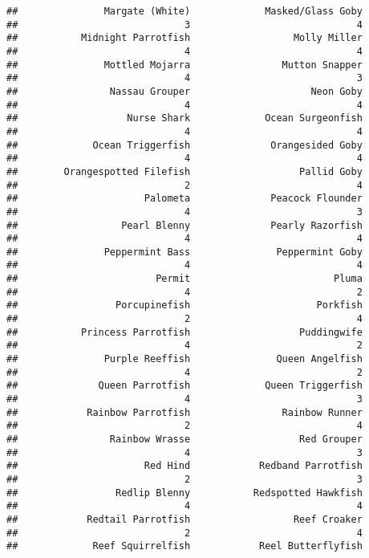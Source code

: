 \documentclass[
]{article}
\begin{document}
\begin{verbatim}
##               Margate (White)             Masked/Glass Goby 
##                             3                             4 
##           Midnight Parrotfish                  Molly Miller 
##                             4                             4 
##               Mottled Mojarra                Mutton Snapper 
##                             4                             3 
##                Nassau Grouper                     Neon Goby 
##                             4                             4 
##                   Nurse Shark             Ocean Surgeonfish 
##                             4                             4 
##             Ocean Triggerfish              Orangesided Goby 
##                             4                             4 
##        Orangespotted Filefish                   Pallid Goby 
##                             2                             4 
##                      Palometa              Peacock Flounder 
##                             4                             3 
##                  Pearl Blenny              Pearly Razorfish 
##                             4                             4 
##               Peppermint Bass               Peppermint Goby 
##                             4                             4 
##                        Permit                         Pluma 
##                             4                             2 
##                 Porcupinefish                      Porkfish 
##                             2                             4 
##           Princess Parrotfish                   Puddingwife 
##                             4                             2 
##               Purple Reeffish               Queen Angelfish 
##                             4                             2 
##              Queen Parrotfish             Queen Triggerfish 
##                             4                             3 
##            Rainbow Parrotfish                Rainbow Runner 
##                             2                             4 
##                Rainbow Wrasse                   Red Grouper 
##                             4                             3 
##                      Red Hind            Redband Parrotfish 
##                             2                             3 
##                 Redlip Blenny           Redspotted Hawkfish 
##                             4                             4 
##            Redtail Parrotfish                  Reef Croaker 
##                             2                             4 
##             Reef Squirrelfish            Reel Butterflyfish 

\end{verbatim}
\end{document}

